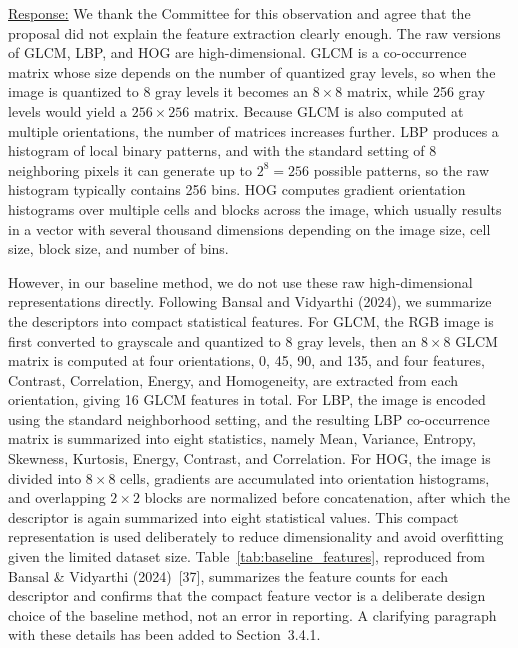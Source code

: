 \documentclass[12pt,a4paper]{article}
\newcommand{\mref}[1]{%
  \marginnote{%
    \color{respblue}\scriptsize
    \rule[-0.3ex]{0.6pt}{1.4ex}\hspace{4pt}%
    \parbox[t]{2.4cm}{\raggedright #1}%
  }%
}
\newenvironment{response}{%
  \par\color{respblue}%
}{\par}
\begin{document}
\mref{\S~3.4.1\\Baseline\\Feature\\Extraction}
\begin{response}
\underline{Response:} We thank the Committee for this observation and agree that the proposal did not explain the feature extraction clearly enough. The raw versions of GLCM, LBP, and HOG are high-dimensional. GLCM is a co-occurrence matrix whose size depends on the number of quantized gray levels, so when the image is quantized to 8 gray levels it becomes an $8\times8$ matrix, while 256 gray levels would yield a $256\times256$ matrix. Because GLCM is also computed at multiple orientations, the number of matrices increases further. LBP produces a histogram of local binary patterns, and with the standard setting of 8 neighboring pixels it can generate up to $2^8 = 256$ possible patterns, so the raw histogram typically contains 256 bins. HOG computes gradient orientation histograms over multiple cells and blocks across the image, which usually results in a vector with several thousand dimensions depending on the image size, cell size, block size, and number of bins.

However, in our baseline method, we do not use these raw high-dimensional representations directly. Following Bansal and Vidyarthi (2024), we summarize the descriptors into compact statistical features. For GLCM, the RGB image is first converted to grayscale and quantized to 8 gray levels, then an $8\times8$ GLCM matrix is computed at four orientations, 0\textdegree, 45\textdegree, 90\textdegree, and 135\textdegree, and four features, Contrast, Correlation, Energy, and Homogeneity, are extracted from each orientation, giving 16 GLCM features in total. For LBP, the image is encoded using the standard neighborhood setting, and the resulting LBP co-occurrence matrix is summarized into eight statistics, namely Mean, Variance, Entropy, Skewness, Kurtosis, Energy, Contrast, and Correlation. For HOG, the image is divided into $8\times8$ cells, gradients are accumulated into orientation histograms, and overlapping $2\times2$ blocks are normalized before concatenation, after which the descriptor is again summarized into eight statistical values. This compact representation is used deliberately to reduce dimensionality and avoid overfitting given the limited dataset size. Table~\ref{tab:baseline_features}, reproduced from Bansal \& Vidyarthi (2024)~[37], summarizes the feature counts for each descriptor and confirms that the compact feature vector is a deliberate design choice of the baseline method, not an error in reporting. A clarifying paragraph with these details has been added to Section~3.4.1.


\end{response}
\end{document}
